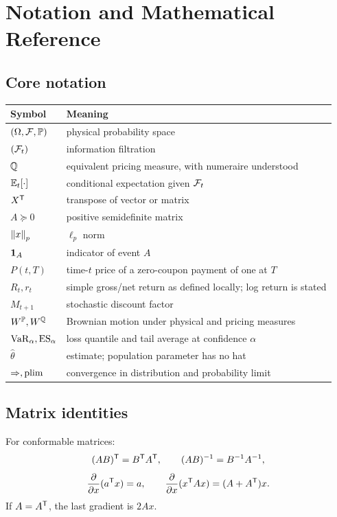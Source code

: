 \chapter{Notation and Mathematical Reference}

\section{Core notation}

\begin{longtable}{p{}p{}}
\toprule
Symbol & Meaning\\
\midrule
$(\Omega,\mathcal F,\mathbb P)$ & physical probability space\\
$(\mathcal F_t)$ & information filtration\\
$\mathbb Q$ & equivalent pricing measure, with numeraire understood\\
$\operatorname{\mathbb E}_t[\cdot]$ & conditional expectation given $\mathcal F_t$\\
$X^\mathsf T$ & transpose of vector or matrix\\
$A\succeq0$ & positive semidefinite matrix\\
$\left\lVert x\right\rVert_p$ & $\ell_p$ norm\\
$\mathbf 1_A$ & indicator of event $A$\\
$P(t,T)$ & time-$t$ price of a zero-coupon payment of one at $T$\\
$R_t,r_t$ & simple gross/net return as defined locally; log return is stated\\
$M_{t+1}$ & stochastic discount factor\\
$W^\mathbb P,W^\mathbb Q$ & Brownian motion under physical and pricing measures\\
$\operatorname{VaR}_\alpha,\operatorname{ES}_\alpha$ & loss quantile and tail average at confidence $\alpha$\\
$\widehat\theta$ & estimate; population parameter has no hat\\
$\Rightarrow,\operatorname{plim}$ & convergence in distribution and probability limit\\
\bottomrule
\end{longtable}

\section{Matrix identities}

For conformable matrices:
\[
(AB)^\mathsf T=B^\mathsf T A^\mathsf T,\qquad
(AB)^{-1}=B^{-1}A^{-1},
\]
\[
\frac{\partial}{\partial x}(a^\mathsf T x)=a,\qquad
\frac{\partial}{\partial x}(x^\mathsf T Ax)=(A+A^\mathsf T)x.
\]
If $A=A^\mathsf T$, the last gradient is $2Ax$.

